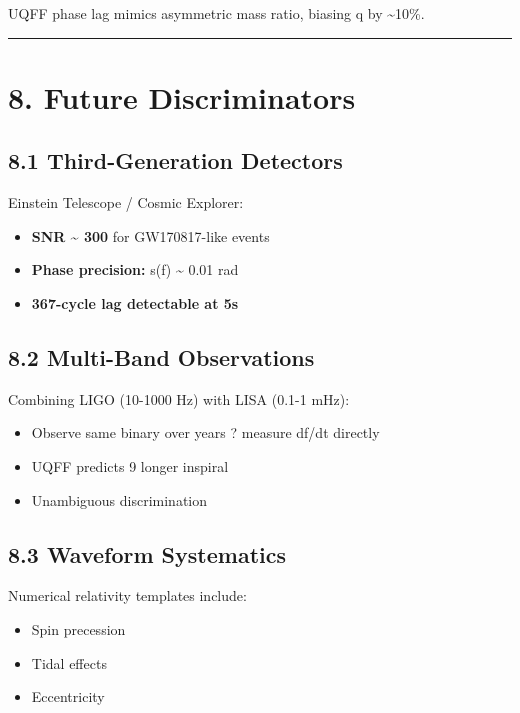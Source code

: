 \documentclass[11pt]{article}
\begin{document}
UQFF phase lag mimics asymmetric mass ratio, biasing q by \textasciitilde{}10\%.

\noindent\rule{\textwidth}{0.4pt}

\section*{8. Future Discriminators}

\subsection*{8.1 Third-Generation Detectors}

Einstein Telescope / Cosmic Explorer:

\begin{itemize}
  \item \textbf{SNR \textasciitilde{} 300} for GW170817-like events
  \item \textbf{Phase precision:} s(f) \textasciitilde{} 0.01 rad
  \item \textbf{367-cycle lag detectable at 5s}
\end{itemize}

\subsection*{8.2 Multi-Band Observations}

Combining LIGO (10-1000 Hz) with LISA (0.1-1 mHz):

\begin{itemize}
  \item Observe same binary over years ? measure df/dt directly
  \item UQFF predicts 9 longer inspiral
  \item Unambiguous discrimination
\end{itemize}

\subsection*{8.3 Waveform Systematics}

Numerical relativity templates include:

\begin{itemize}
  \item Spin precession
  \item Tidal effects
  \item Eccentricity
\end{itemize}
\end{document}
